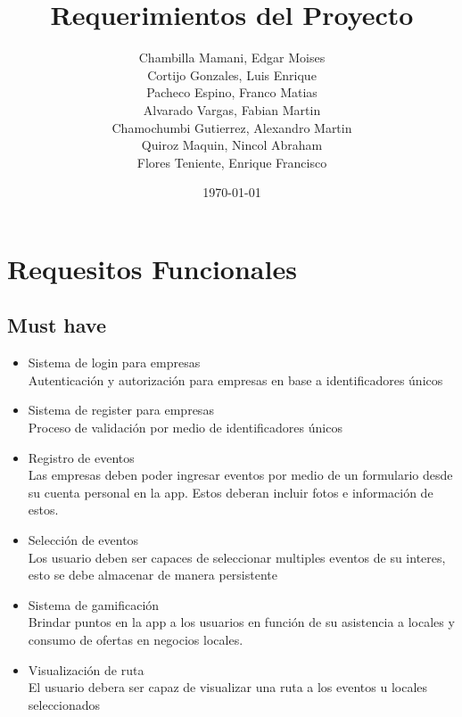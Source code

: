 \documentclass[a4paper,12pt,oneside]{article}
\author{
  \begin{tabular}{cc}
      \\
  Chambilla Mamani, Edgar Moises \\
  Cortijo Gonzales, Luis Enrique \\
  Pacheco Espino, Franco Matias \\
  Alvarado Vargas, Fabian Martin \\
  Chamochumbi Gutierrez, Alexandro Martin \\
  Quiroz Maquin, Nincol Abraham \\
  Flores Teniente, Enrique Francisco \\
  \end{tabular}
}
\title{Requerimientos del Proyecto}
\date{\today}
\begin{document}


\tableofcontents
\newpage


\section{Requesitos Funcionales}

\subsection{Must have}
  \begin{itemize}
    \item Sistema de login para empresas \\
      Autenticación y autorización para empresas en base a identificadores únicos
    \item Sistema de register para empresas \\
      Proceso de validación por medio de identificadores únicos
    \item Registro de eventos \\
      Las empresas deben poder ingresar eventos por medio de un formulario desde su cuenta personal en la app. Estos deberan incluir fotos e información de estos.
    \item Selección de eventos \\
      Los usuario deben ser capaces de seleccionar multiples eventos de su interes, esto se debe almacenar de manera persistente
    \item Sistema de gamificación \\
      Brindar puntos en la app a los usuarios en función de su asistencia a locales y consumo de ofertas en negocios locales.
    \item Visualización de ruta \\
      El usuario debera ser capaz de visualizar una ruta a los eventos u locales seleccionados

  \end{itemize}
\end{document}
